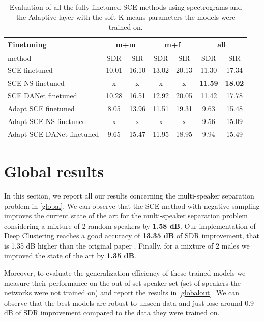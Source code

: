 \documentclass[master, tikz, final,11pt, dvipdfmx]{iscs-thesis}
\begin{document}
\begin{table}[h]
\begin{tabular}{l|c|c|c|c|c|c}
Finetuning & \multicolumn{2}{c|}{m+m} & \multicolumn{2}{c|}{m+f} & \multicolumn{2}{c}{all} \\ 
\hline 
method & SDR & SIR & SDR & SIR & SDR & SIR \\ 
\hline
SCE finetuned  & 10.01 & 16.10 & 13.02 & 20.13 & 11.30 & 17.34 \\ 
SCE NS finetuned & x & x & x & x & \textbf{11.59} & \textbf{18.02} \\ 
SCE DANet finetuned  & 10.28 & 16.51 & 12.92 & 20.05 & 11.42 & 17.78 \\ 
\hline 
\hline 
Adapt SCE finetuned  & 8.05 & 13.96 & 11.51 & 19.31 & 9.63 & 15.48 \\ 
Adapt SCE NS finetuned& x & x & x & x & 9.56 & 15.09 \\ 
Adapt SCE DANet finetuned & 9.65 & 15.47 & 11.95 & 18.95 & 9.94 & 15.49 \\ 

\end{tabular}
\caption[Evaluation of all the fully finetuned SCE improvement methods using spectrograms and the Adaptive layer]{Evaluation of all the fully finetuned SCE methods using spectrograms and the Adaptive layer with the soft K-means parameters the models were trained on.}
\label{table:finetune}
\end{table}


\section{Global results}
\label{res:glo}
In this section, we report all our results concerning the multi-speaker separation problem in \autoref{global}.
We can observe that the SCE method with negative sampling improves the current state of the art for the multi-speaker separation problem considering a mixture of 2 random speakers by \textbf{1.58 dB}. Our implementation of Deep Clustering reaches a good accuracy of\textbf{ 13.35 dB} of SDR improvement, that is 1.35 dB higher than the original paper \cite{DPCLV2}. Finally, for a mixture of 2 males we improved the state of the art by \textbf{1.35 dB}.

Moreover, to evaluate the generalization efficiency of these trained models we measure their performance on the out-of-set speaker set (set of speakers the networks were not trained on) and report the results in \autoref{globalout}. We can observe that the best models are robust to unseen data and just lose around 0.9 dB of SDR improvement compared to the data they were trained on.
\end{document}
